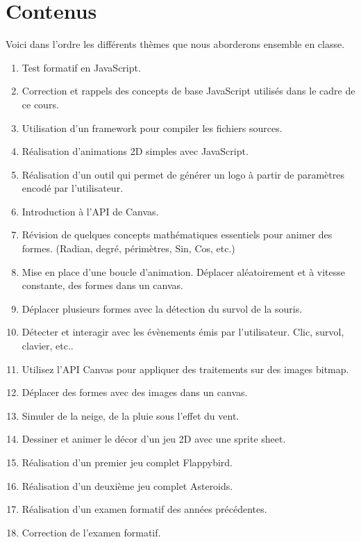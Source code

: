 \section{Contenus}
\label{Contenus}Voici dans l'ordre les différents thèmes que nous aborderons ensemble en classe.

\begin{enumerate}
    \item Test formatif en JavaScript.
    \item Correction et rappels des concepts de base JavaScript utilisés dans le cadre de ce cours.
    \item Utilisation d’un framework pour compiler les fichiers sources.
    \item Réalisation d'animations 2D simples avec JavaScript.
    \item Réalisation d’un outil qui permet de générer un logo à partir de paramètres encodé par l’utilisateur.
    \item Introduction à l’API de Canvas.
    \item Révision de quelques concepts mathématiques essentiels pour animer des formes. (Radian, degré, périmètres, Sin, Cos, etc.)
    \item Mise en place d’une boucle d’animation. Déplacer aléatoirement et à vitesse constante, des formes dans un canvas.
    \item Déplacer plusieurs formes avec la détection du survol de la souris.
    \item Détecter et interagir avec les évènements émis par l'utilisateur. Clic, survol, clavier, etc..
    \item Utilisez l’API Canvas pour appliquer des traitements sur des images bitmap.
    \item Déplacer des formes avec des images dans un canvas.
    \item Simuler de la neige, de la pluie sous l'effet du vent.
    \item Dessiner et animer le décor d’un jeu 2D avec une sprite sheet.
    \item Réalisation d’un premier jeu complet Flappybird.
    \item Réalisation d’un deuxième jeu complet Asteroids.
    \item Réalisation d’un examen formatif des années précédentes.
    \item Correction de l'examen formatif.
\end{enumerate}
